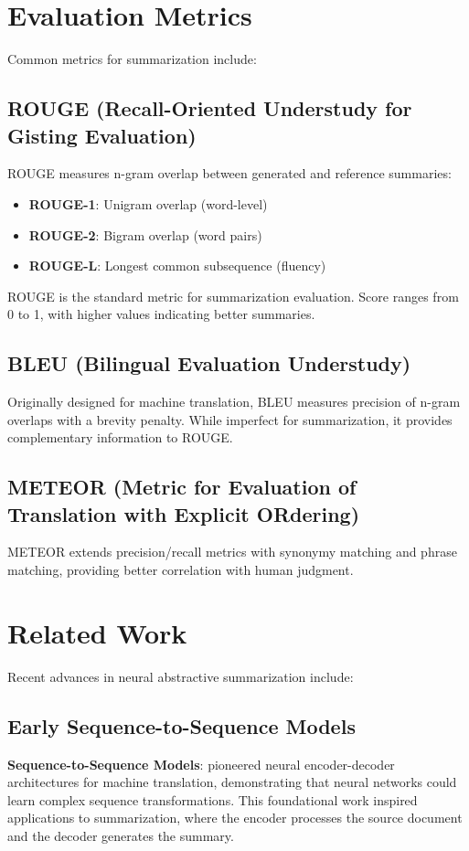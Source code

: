 \documentclass[12pt,a4paper,oneside]{report}
\begin{document}
\section{Evaluation Metrics}
Common metrics for summarization include:

\subsection{ROUGE (Recall-Oriented Understudy for Gisting Evaluation)}
ROUGE measures n-gram overlap between generated and reference summaries:
\begin{itemize}
    \item \textbf{ROUGE-1}: Unigram overlap (word-level)
    \item \textbf{ROUGE-2}: Bigram overlap (word pairs)
    \item \textbf{ROUGE-L}: Longest common subsequence (fluency)
\end{itemize}

ROUGE is the standard metric for summarization evaluation. Score ranges from 0 to 1, with higher values indicating better summaries.

\subsection{BLEU (Bilingual Evaluation Understudy)}
Originally designed for machine translation, BLEU measures precision of n-gram overlaps with a brevity penalty. While imperfect for summarization, it provides complementary information to ROUGE.

\subsection{METEOR (Metric for Evaluation of Translation with Explicit ORdering)}
METEOR extends precision/recall metrics with synonymy matching and phrase matching, providing better correlation with human judgment.

\section{Related Work}
Recent advances in neural abstractive summarization include:

\subsection{Early Sequence-to-Sequence Models}
\textbf{Sequence-to-Sequence Models}: \cite{sutskever2014sequence} pioneered neural encoder-decoder architectures for machine translation, demonstrating that neural networks could learn complex sequence transformations. This foundational work inspired applications to summarization, where the encoder processes the source document and the decoder generates the summary.
\end{document}
